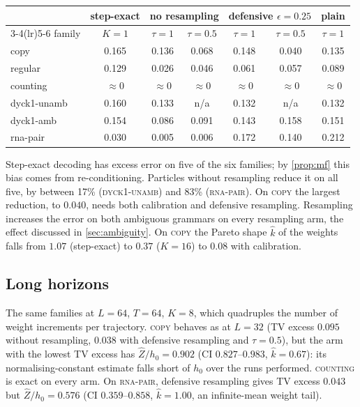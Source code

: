 \documentclass[11pt]{article}
\theoremstyle{definition}
\newcommand{\Zh}{\widehat Z}
\begin{document}
\begin{center}\small
\begin{tabular}{lcccccc}
\toprule
 & step-exact & \multicolumn{2}{c}{no resampling} & \multicolumn{2}{c}{defensive $\epsilon=0.25$} & plain \\
\cmidrule(lr){3-4}\cmidrule(lr){5-6}
family & $K=1$ & $\tau=1$ & $\tau=0.5$ & $\tau=1$ & $\tau=0.5$ & $\tau=1$ \\
\midrule
copy          & 0.165 & 0.136 & 0.068 & 0.148 & 0.040 & 0.135\\
regular       & 0.129 & 0.026 & 0.046 & 0.061 & 0.057 & 0.089\\
counting      & $\approx0$ & $\approx0$ & $\approx0$ & $\approx0$ & $\approx0$ & $\approx0$\\
dyck1-unamb   & 0.160 & 0.133 & n/a   & 0.132 & n/a   & 0.132\\
dyck1-amb     & 0.154 & 0.086 & 0.091 & 0.143 & 0.158 & 0.151\\
rna-pair      & 0.030 & 0.005 & 0.006 & 0.172 & 0.140 & 0.212\\
\bottomrule
\end{tabular}
\end{center}

Step-exact decoding has excess error on five of the six families; by \cref{prop:mf} this bias comes from
re-conditioning. Particles without resampling reduce it on all five, by between 17\% (\textsc{dyck1-unamb}) and
83\% (\textsc{rna-pair}). On \textsc{copy} the largest reduction, to $0.040$, needs both calibration and
defensive resampling. Resampling increases the error on both ambiguous grammars on every resampling arm, the
effect discussed in \cref{sec:ambiguity}. On \textsc{copy} the Pareto shape $\hat k$ of the weights falls from
$1.07$ (step-exact) to $0.37$ ($K=16$) to $0.08$ with calibration.

\subsection{Long horizons}\label{sec:expb}
The same families at $L=64$, $T=64$, $K=8$, which quadruples the number of weight increments per trajectory.
\textsc{copy} behaves as at $L=32$ (TV excess $0.095$ without resampling, $0.038$ with defensive resampling and
$\tau=0.5$), but the arm with the lowest TV excess has $\Zh/h_0=0.902$ (CI $0.827$--$0.983$, $\hat k=0.67$): its
normalising-constant estimate falls short of $h_0$ over the runs performed. \textsc{counting} is exact on every
arm. On \textsc{rna-pair}, defensive resampling gives TV excess $0.043$ but $\Zh/h_0=0.576$ (CI
$0.359$--$0.858$, $\hat k=1.00$, an infinite-mean weight tail).
\end{document}
